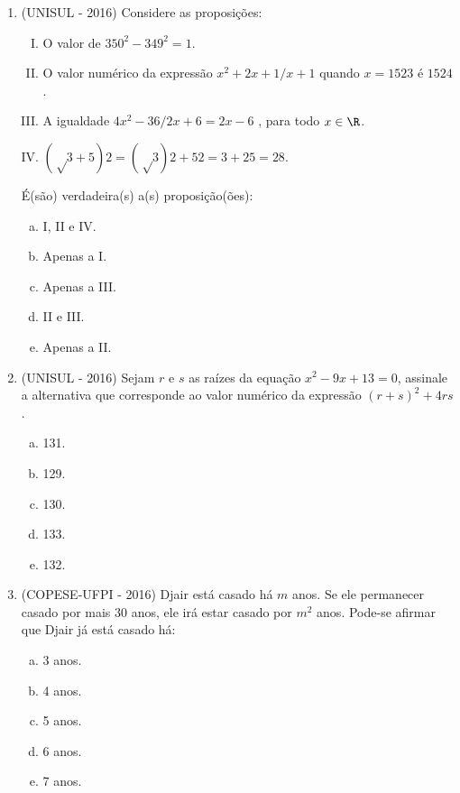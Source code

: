 \begin{enumerate}
 \item (UNISUL - 2016) Considere as proposições:
 \begin{enumerate}[I)]
 \item O valor de $350^2 - 349^2 = 1$.
 \item O valor numérico da expressão  $x^2+ 2x + 1 / x+1$ quando $x = 1523$ é $1524$.
 \item A igualdade $4x^2 - 36 / 2x + 6 = 2x - 6$ , para todo $x \in \R$.
 \item $(√3 + 5)2 = (√3)2 + 52 = 3 + 25 =28$.
 \end{enumerate}
 É(são) verdadeira(s) a(s) proposição(ões):
 \begin{enumerate}[a)]
 \item I, II e IV.
 \item Apenas a I.
 \item Apenas a III.
 \item II e III.
 \item Apenas a II.
 \end{enumerate}
 
 \item (UNISUL - 2016) Sejam $r$ e $s$ as raízes da equação $x^2 - 9x + 13 = 0$, assinale a alternativa que corresponde ao valor numérico da expressão $(r + s)^2 + 4rs$.
 \begin{multicols}{5}
 \begin{enumerate}[a)]
 \item 131.
 \item 129.
 \item 130.
 \item 133.
 \item 132.
 \end{enumerate}
 \end{multicols}
 
 \item (COPESE-UFPI - 2016) Djair está casado há $m$ anos. Se ele permanecer casado por mais $30$ anos, ele irá estar casado por $m^2$ anos. Pode-se afirmar que Djair já está casado há:
 \begin{multicols}{5}
 \begin{enumerate}[a)]
 \item 3 anos.
 \item 4 anos.
 \item 5 anos.
 \item 6 anos.
 \item 7 anos.
 \end{enumerate}
 \end{multicols}
 

\end{enumerate}
